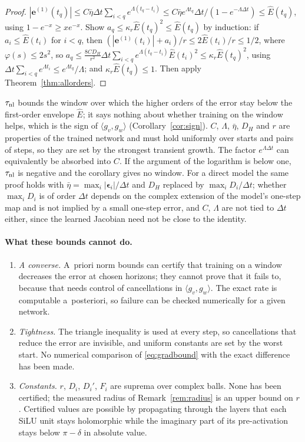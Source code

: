 \documentclass[11pt]{article}
\theoremstyle{definition}
\theoremstyle{remark}
\newcommand{\ee}{\mathbf{e}}
\newcommand{\eps}{\bm{\epsilon}}
\newcommand{\dt}{\Delta t}
\begin{document}
\begin{proof}
$|\ee^{(1)}(t_q)|\le C\bar\eta\dt\sum_{i<q}e^{\Lambda(t_q-t_i)}\le C\bar\eta e^{\Lambda t_q}\dt/(1-e^{-\Lambda\dt})\le\hat E(t_q)$, using $1-e^{-x}\ge xe^{-x}$.
Show $a_q\le\kappa_r\hat E(t_q)^2\le\hat E(t_q)$ by induction: if $a_i\le\hat E(t_i)$ for $i<q$, then $(|\ee^{(1)}(t_i)|+a_i)/r\le2\hat E(t_i)/r\le1/2$, where $\varphi(s)\le2s^2$, so $a_q\le\frac{8CD_H}{r^2}\dt\sum_{i<q}e^{\Lambda(t_q-t_i)}\hat E(t_i)^2\le\kappa_r\hat E(t_q)^2$, using $\dt\sum_{i<q}e^{\Lambda t_i}\le e^{\Lambda t_q}/\Lambda$; and $\kappa_r\hat E(t_q)\le1$. Then apply Theorem~\ref{thm:allorders}.
\end{proof}

$\tau_{\rm nl}$ bounds the window over which the higher orders of the error stay below the first-order envelope $\hat E$; it says nothing about whether training on the window helps, which is the sign of $\langle g_v,g_w\rangle$ (Corollary~\ref{cor:sign}).
$C$, $\Lambda$, $\bar\eta$, $D_H$ and $r$ are properties of the trained network and must hold uniformly over starts and pairs of steps, so they are set by the strongest transient growth.
The factor $e^{\Lambda\dt}$ can equivalently be absorbed into $C$. If the argument of the logarithm is below one, $\tau_{\rm nl}$ is negative and the corollary gives no window.
For a direct model the same proof holds with $\bar\eta=\max_i|\eps_i|/\dt$ and $D_H$ replaced by $\max_iD_i/\dt$; whether $\max_iD_i$ is of order $\dt$ depends on the complex extension of the model's one-step map and is not implied by a small one-step error, and $C$, $\Lambda$ are not tied to $\dt$ either, since the learned Jacobian need not be close to the identity.

\paragraph{What these bounds cannot do.}
\begin{enumerate}
\item \emph{A converse.} A~priori norm bounds can certify that training on a window decreases the error at chosen horizons; they cannot prove that it fails to, because that needs control of cancellations in $\langle g_v,g_w\rangle$. The exact rate is computable a~posteriori, so failure can be checked numerically for a given network.
\item \emph{Tightness.} The triangle inequality is used at every step, so cancellations that reduce the error are invisible, and uniform constants are set by the worst start. No numerical comparison of \eqref{eq:gradbound} with the exact difference has been made.
\item \emph{Constants.} $r$, $D_i$, $D_i'$, $F_i$ are suprema over complex balls. None has been certified; the measured radius of Remark~\ref{rem:radius} is an upper bound on $r$. Certified values are possible by propagating through the layers that each SiLU unit stays holomorphic while the imaginary part of its pre-activation stays below $\pi-\delta$ in absolute value.
\end{enumerate}
\end{document}
